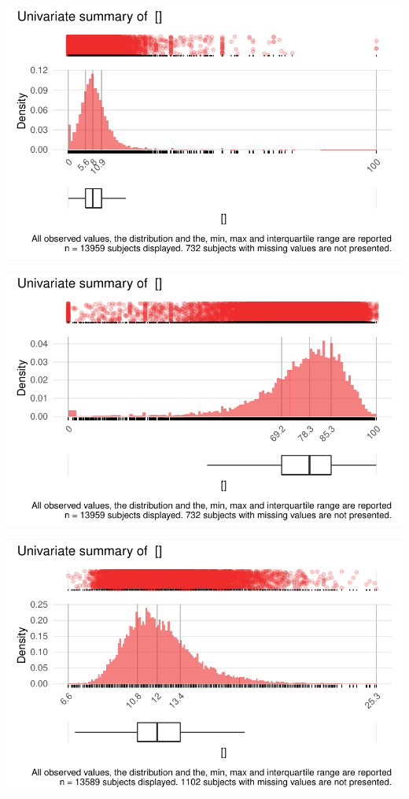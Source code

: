 \documentclass[
  letterpaper,
  DIV=11,
  numbers=noendperiod]{scrreport}
\begin{document}
\includegraphics{./Bact_univar_files/figure-pdf/uni04-35.pdf}

\includegraphics{./Bact_univar_files/figure-pdf/uni04-36.pdf}

\includegraphics{./Bact_univar_files/figure-pdf/uni04-37.pdf}
\end{document}
